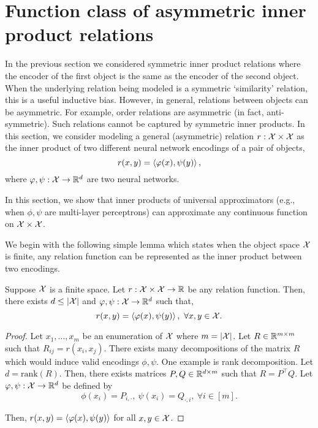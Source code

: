 \section{Function class of asymmetric inner product relations}\label{sec:asymmetric_relations}

In the previous section we considered symmetric inner product relations where the encoder of the first object is the same as the encoder of the second object. When the underlying relation being modeled is a symmetric `similarity' relation, this is a useful inductive bias. However, in general, relations between objects can be asymmetric. For example, order relations are asymmetric (in fact, anti-symmetric). Such relations cannot be captured by symmetric inner products. In this section, we consider modeling a general (asymmetric) relation $r: {\mathcal{X}} \times {\mathcal{X}}$ as the inner product of two different neural network encodings of a pair of objects,
\begin{equation}\label{eq:asymmetric_iprod_relation}
    r(x, y) = \iprod{\phi(x)}{\psi(y)},
\end{equation}
where $\varphi, \psi: {\mathcal{X}} \to \mathbb{R}^d$ are two neural networks.

In this section, we show that inner products of universal approximators (e.g., when $\phi, \psi$ are multi-layer perceptrons) can approximate any continuous function on ${\mathcal{X}} \times {\mathcal{X}}$.

We begin with the following simple lemma which states when the object space ${\mathcal{X}}$ is finite, any relation function can be represented as the inner product between two encodings.

\begin{lemma}\label{lemma:finite_space_rel}
    Suppose ${\mathcal{X}}$ is a finite space. Let $r: {\mathcal{X}} \times {\mathcal{X}} \to \mathbb{R}$ be any relation function. Then, there exists $d \leq \left\lvert{\mathcal{X}}\right\rvert$ and $\varphi, \psi: {\mathcal{X}} \to \mathbb{R}^{d}$ such that,
    \begin{equation*}
        r(x, y) = \iprod{\phi(x)}{\psi(y)}, \ \forall x, y \in \calX.
    \end{equation*}
\end{lemma}

\begin{proof}
    Let $x_1, \ldots, x_m$ be an enumeration of ${\mathcal{X}}$ where $m = \left\lvert{\mathcal{X}}\right\rvert$. Let $R \in \mathbb{R}^{m \times m}$ such that $R_{ij} = r(x_i, x_j)$. There exists many decompositions of the matrix $R$ which would induce valid encodings $\phi, \psi$. One example is rank decomposition. Let $d = \mathrm{rank}(R)$. Then, there exists matrices $P, Q \in \mathbb{R}^{d \times m}$ such that $R = P^\top Q$. Let $\varphi, \psi: {\mathcal{X}} \to \mathbb{R}^{d}$ be defined by
    \begin{equation}
        \phi(x_i) = P_{i, \cdot}, \ \psi(x_i) = Q_{\cdot, i}, \ \forall i \in [m].
    \end{equation}

    Then, $r(x, y) = \left \langle \varphi(x), \psi(y) \right\rangle$ for all $x, y \in {\mathcal{X}}$.
\end{proof}

